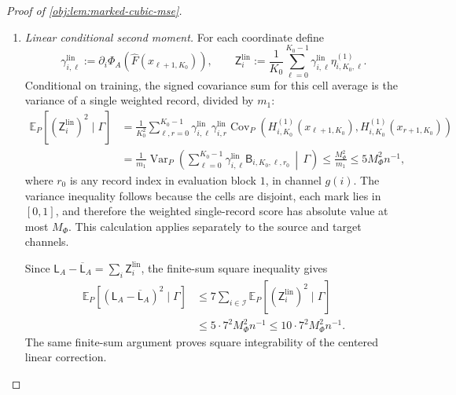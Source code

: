 \begin{proof}[Proof of \cref{obj:lem:marked-cubic-mse}]
\begin{enumerate}
\item \textit{Linear conditional second moment.}
For each coordinate define
\[
\gamma^{\mathrm{lin}}_{i,\ell}
:=\partial_i\Phi_A(\widehat F(x_{\ell+1,K_0})),
\qquad
\mathsf Z^{\mathrm{lin}}_i
:=\frac1{K_0}\sum_{\ell=0}^{K_0-1}
\gamma^{\mathrm{lin}}_{i,\ell}\eta^{(1)}_{i,K_0,\ell}.
\]
Conditional on training, the signed covariance sum for this cell average is the variance of a single weighted record, divided by \(m_1\):
\[
\begin{aligned}
\mathbb E_P[(\mathsf Z^{\mathrm{lin}}_i)^2\mid\Gamma]
&=
\frac1{K_0^2}\sum_{\ell,r=0}^{K_0-1}
\gamma^{\mathrm{lin}}_{i,\ell}\gamma^{\mathrm{lin}}_{i,r}
\operatorname{Cov}_P\!\left(
H_{i,K_0}^{(1)}(x_{\ell+1,K_0}),
H_{i,K_0}^{(1)}(x_{r+1,K_0})
\right)\\
&=
\frac1{m_1}
\operatorname{Var}_P\!\left(
\sum_{\ell=0}^{K_0-1}
\gamma^{\mathrm{lin}}_{i,\ell}
\mathsf B_{i,K_0,\ell,r_0}
\,\middle|\,\Gamma
\right)
\le\frac{M_\Phi^2}{m_1}
\le5M_\Phi^2n^{-1},
\end{aligned}
\]
where \(r_0\) is any record index in evaluation block \(1\), in channel \(g(i)\). The variance inequality follows because the cells are disjoint, each mark lies in \([0,1]\), and therefore the weighted single-record score has absolute value at most \(M_\Phi\). This calculation applies separately to the source and target channels.

Since \(\mathsf L_A-\overline{\mathsf L}_A=\sum_i\mathsf Z_i^{\mathrm{lin}}\), the finite-sum square inequality gives
\[
\begin{aligned}
\mathbb E_P[(\mathsf L_A-\overline{\mathsf L}_A)^2\mid\Gamma]
&\le7\sum_{i\in\mathcal I}
\mathbb E_P[(\mathsf Z_i^{\mathrm{lin}})^2\mid\Gamma]\\
&\le5\cdot7^2M_\Phi^2n^{-1}
\le10\cdot7^2M_\Phi^2n^{-1}.
\end{aligned}
\]
The same finite-sum argument proves square integrability of the centered linear correction.


\end{enumerate}
\end{proof}
